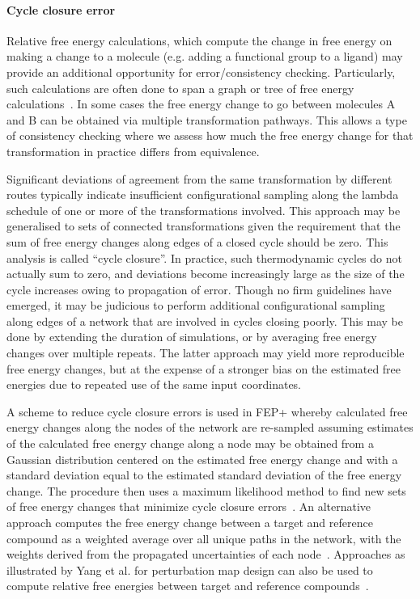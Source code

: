 \documentclass[9pt,bestpractices,pubversion]{livecoms}
\begin{document}
\paragraph{Cycle closure error}
Relative free energy calculations, which compute the change in free energy on making a change to a molecule (e.g. adding a functional group to a ligand) may provide an additional opportunity for error/consistency checking. Particularly, such calculations are often done to span a graph or tree of free energy calculations~\cite{xu2019optimal,wang2013modeling,liu2013lead}. In some cases the free energy change to go between molecules A and B can be obtained via multiple transformation pathways. This allows a type of consistency checking where we assess how much the free energy change for that transformation in practice differs from equivalence. 

Significant deviations of agreement from the same transformation by different routes typically indicate insufficient configurational sampling along the lambda schedule of one or more of the transformations involved. This approach may be generalised to sets of connected transformations given the requirement that the sum of free energy changes along edges of a closed cycle should be zero. This analysis is called ``cycle closure''. In practice, such thermodynamic cycles do not actually sum to zero, and deviations become increasingly large as the size of the cycle increases owing to propagation of error. Though no firm guidelines have emerged, it may be judicious to perform additional configurational sampling along edges of a network that are involved in cycles closing poorly. This may be done by extending the duration of simulations, or by averaging free energy changes over multiple repeats. The latter approach may yield more reproducible free energy changes, but at the expense of a stronger bias on the estimated free energies due to repeated use of the same input coordinates.

A scheme to reduce cycle closure errors is used in FEP+ whereby calculated free energy changes along the nodes of the network are re-sampled assuming estimates of the calculated free energy change along a node may be obtained from a Gaussian distribution centered on the estimated free energy change and with a standard deviation equal to the estimated standard deviation of the free energy change. The procedure then uses a maximum likelihood method to find new sets of free energy changes that minimize cycle closure errors~\cite{wang2013modeling}. An alternative approach computes the free energy change between a target and reference compound as a weighted average over all unique paths in the network, with the weights derived from the propagated uncertainties of each node~\cite{mey2016blinded}. Approaches as illustrated by Yang et al. for perturbation map design can also be used to compute relative free energies between target and reference compounds~\cite{yang2020optimal}.
\end{document}
